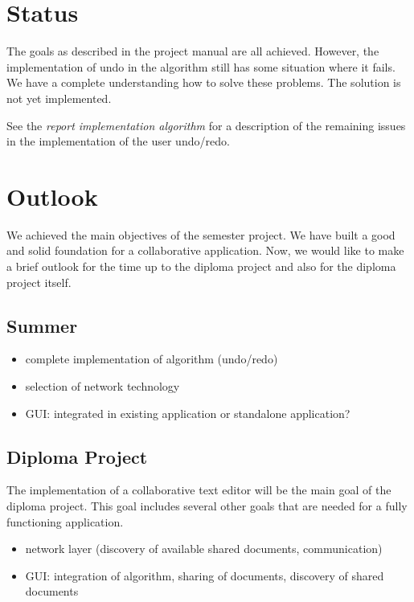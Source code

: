 \documentclass[11pt,a4paper]{article}
\begin{document}
\section{Status}
The goals as described in the project manual are all achieved. However, the implementation of undo in the algorithm still has some situation where it fails. We have a complete understanding how to solve these problems. The solution is not yet implemented.

See the \emph{report implementation algorithm} for a description of the remaining issues in the implementation of the user undo/redo.


\section{Outlook}
We achieved the main objectives of the semester project. We have built a good and solid foundation for a collaborative application. Now, we would like to make a brief outlook for the time up to the diploma project and also for the diploma project itself.

\subsection{Summer}
\begin{itemize}
 \item complete implementation of algorithm (undo/redo)
 \item selection of network technology
 \item GUI: integrated in existing application or standalone application?
\end{itemize}

\subsection{Diploma Project}
The implementation of a collaborative text editor will be the main goal of the diploma project. This goal includes several other goals that are needed for a fully functioning application.
\begin{itemize}
 \item network layer (discovery of available shared documents, communication)
 \item GUI: integration of algorithm, sharing of documents, discovery of shared documents
\end{itemize}
\end{document}
